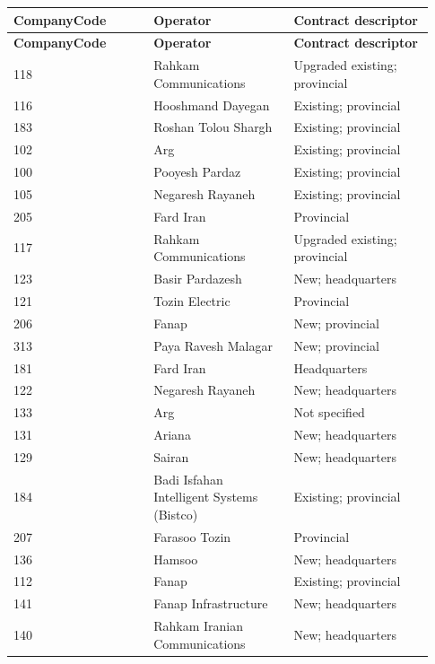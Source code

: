 \documentclass[11pt,a4paper]{article}
\begin{document}
\begingroup\small\setlength{\tabcolsep}{3pt}\renewcommand{\arraystretch}{1.2}
\begin{longtable}{@{}p{0.3100\linewidth}p{0.3100\linewidth}p{0.3100\linewidth}@{}}
\toprule
\textbf{CompanyCode} & \textbf{Operator} & \textbf{Contract descriptor} \\ \midrule
\endfirsthead
\textbf{CompanyCode} & \textbf{Operator} & \textbf{Contract descriptor} \\ \midrule \endhead
118 & Rahkam Communications & Upgraded existing;\allowbreak{} provincial \\
116 & Hooshmand Dayegan & Existing;\allowbreak{} provincial \\
183 & Roshan Tolou Shargh & Existing;\allowbreak{} provincial \\
102 & Arg & Existing;\allowbreak{} provincial \\
100 & Pooyesh Pardaz & Existing;\allowbreak{} provincial \\
105 & Negaresh Rayaneh & Existing;\allowbreak{} provincial \\
205 & Fard Iran & Provincial \\
117 & Rahkam Communications & Upgraded existing;\allowbreak{} provincial \\
123 & Basir Pardazesh & New;\allowbreak{} headquarters \\
121 & Tozin Electric & Provincial \\
206 & Fanap & New;\allowbreak{} provincial \\
313 & Paya Ravesh Malagar & New;\allowbreak{} provincial \\
181 & Fard Iran & Headquarters \\
122 & Negaresh Rayaneh & New;\allowbreak{} headquarters \\
133 & Arg & Not specified \\
131 & Ariana & New;\allowbreak{} headquarters \\
129 & Sairan & New;\allowbreak{} headquarters \\
184 & Badi Isfahan Intelligent Systems (Bistco) & Existing;\allowbreak{} provincial \\
207 & Farasoo Tozin & Provincial \\
136 & Hamsoo & New;\allowbreak{} headquarters \\
112 & Fanap & Existing;\allowbreak{} provincial \\
141 & Fanap Infrastructure & New;\allowbreak{} headquarters \\
140 & Rahkam Iranian Communications & New;\allowbreak{} headquarters \\

\end{longtable}
\end{document}
